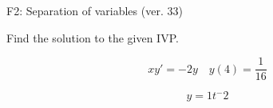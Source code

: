 \begin{exercise}
  \begin{exerciseTitle}F2: Separation of variables (ver. 33)\end{exerciseTitle}
  \begin{exerciseStatement}
    
Find the solution to the given IVP.

    
\[xy'= -2 y \hspace{1em} y( 4 ) = \frac{1}{16}\]

  \end{exerciseStatement}
  \begin{exerciseAnswer}
    
\[y= 1 t^ -2\]

  \end{exerciseAnswer}
\end{exercise}